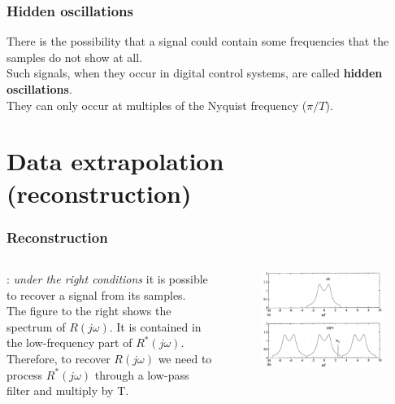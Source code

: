 \begin{frame}
	\frametitle{Hidden oscillations}
	\vspace{-15ex}
	There is the possibility that a signal could contain some frequencies that the samples do not show at all. \\
	Such signals, when they occur in digital control systems, are called \textbf{hidden oscillations}. \\
	They can only occur at multiples of the Nyquist frequency ($\pi/T$).
\end{frame}

\section{Data extrapolation (reconstruction)}

\begin{frame}
	\frametitle{Reconstruction}
	\begin{columns}
		\underline{}: \textit{under the right conditions} it is possible to recover a signal from its samples.\\
		\medskip
		The figure to the right shows the spectrum of $R(j\omega)$. It is contained in the low-frequency part of $R^*(j\omega)$. Therefore, to recover $R(j\omega)$ we need to process $R^*(j\omega)$ through a low-pass filter and multiply by T.\\
		\vspace{-4ex}
		\begin{figure}
			\includegraphics[width=1.1\linewidth]{reconstruction}
		\end{figure}
	\end{columns}
\end{frame}

